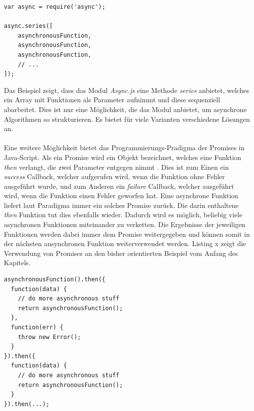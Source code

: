 \vspace{0.6cm}
\begin{lstlisting}[caption=Sequenzielle Abarbeitung von asynchronen Code durch das Async.js Module,label=asyncjs]
var async = require('async');

async.series([
    asynchronousFunction,
    asynchronousFunction,
    asynchronousFunction,
    // ...
]);
\end{lstlisting}
\vspace{0.3cm}

Das Beispiel zeigt, dass das Modul \textit{Async.js} eine Methode \textit{series} anbietet, welches ein Array mit Funktionen als Parameter aufnimmt und diese sequenziell abarbeitet. Dies ist nur eine Möglichkeit, die das Modul anbietet, um asynchrone Algorithmen so strukturieren. Es bietet für viele Varianten verschiedene Lösungen an.\\
\\
Eine weitere Möglichkeit bietet das Programmierungs-Pradigma der \glqq Promises\grqq{} in Java-Script. Als ein Promise wird ein Objekt bezeichnet, welches eine Funktion \textit{then} verlangt, die zwei Parameter entgegen nimmt \cite{promises}. Dies ist zum Einen ein \textit{success} Callback, welcher aufgerufen wird, wenn die Funktion ohne Fehler ausgeführt wurde, und zum Anderen ein \textit{failure} Callback, welcher ausgeführt wird, wenn die Funktion einen Fehler geworfen hat. Eine asynchrone Funktion liefert laut Paradigma immer ein solches Promise zurück. Die darin enthaltene \textit{then} Funktion tut dies ebenfalls wieder. Dadurch wird es möglich, beliebig viele asynchronen Funktionen miteinander zu verketten. Die Ergebnisse der jeweiligen Funktionen werden dabei immer dem Promise weitergegeben und können somit in der nächsten ansynchronen Funktion weiterverwendet werden. Listing x zeigt die Verwendung von Promises an den bisher orientierten Beispiel vom Anfang des Kapitels. 

\vspace{1.8cm}
\begin{lstlisting}[caption=Sequenzielle Abarbeitung von asynchronen Code durch das Async.js Module,label=asyncjs]
asynchronousFunction().then({
  function(data) {
    // do more asynchronous stuff
    return asynchronousFunction();
  },
  function(err) {
    throw new Error();
  }
}).then({
  function(data) {
    // do more asynchronous stuff
    return asynchronousFunction();
  }
}).then(...);
\end{lstlisting}
\vspace{0.1cm}

